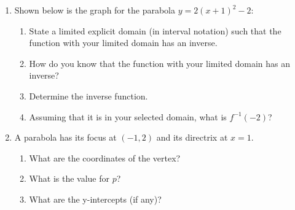 \documentclass[letterpaper,12pt,fleqn]{article}
\begin{document}
\begin{enumerate}
\item Shown below is the graph for the parabola $y=2(x+1)^2-2$:


  \begin{enumerate}
  \item State a limited explicit domain (in interval notation) such that
    the function with your limited domain has an inverse.

    \vspace{0.5in}
    
  \item How do you know that the function with your limited domain has an
    inverse?

    \vspace{0.5in}
    
  \item Determine the inverse function.

    \vspace{2.5in}
    
  \item Assuming that it is in your selected domain, what is $f^{-1}(-2)$?
  \end{enumerate}

  \newpage

\item A parabola has its focus at $(-1,2)$ and its directrix at $x=1$.
  \begin{enumerate}
  \item What are the coordinates of the vertex?

    \vspace{1in}
    
  \item What is the value for $p$?

    \vspace{1in}
    
  \item What are the y-intercepts (if any)?


\end{enumerate}
\end{enumerate}
\end{document}
